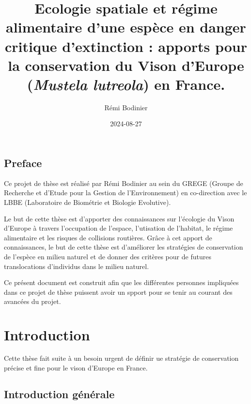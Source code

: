 \documentclass[
  letterpaper,
  DIV=11,
  numbers=noendperiod]{scrreprt}
\title{Ecologie spatiale et régime alimentaire d'une espèce en danger
critique d'extinction : apports pour la conservation du Vison d'Europe
(\emph{Mustela lutreola}) en France.}
\author{Rémi Bodinier}
\date{2024-08-27}
\renewcommand*\contentsname{Table of contents}
\newcommand\contentsname{Table of contents}
\begin{document}
\maketitle

\renewcommand*\contentsname{Table of contents}
{
\hypersetup{linkcolor=}
\setcounter{tocdepth}{2}
\tableofcontents
}

\chapter*{Preface}\label{preface}


Ce projet de thèse est réalisé par Rémi Bodinier au sein du GREGE
(Groupe de Recherche et d'Etude pour la Gestion de l'Environnement) en
co-direction avec le LBBE (Laboratoire de Biométrie et Biologie
Evolutive).

Le but de cette thèse est d'apporter des connaissances sur l'écologie du
Vison d'Europe à travers l'occupation de l'espace, l'utisation de
l'habitat, le régime alimentaire et les risques de collisions routières.
Grâce à cet apport de connaissances, le but de cette thèse est
d'améliorer les stratégies de conservation de l'espèce en milieu naturel
et de donner des critères pour de futures translocations d'individus
dans le milieu naturel.

Ce présent document est construit afin que les différentes personnes
impliquées dans ce projet de thèse puissent avoir un spport pour se
tenir au courant des avancées du projet.

\part{Introduction}

Cette thèse fait suite à un besoin urgent de définir ue stratégie de
conservation précise et fine pour le vison d'Europe en France.

\chapter{Introduction générale}\label{introduction-guxe9nuxe9rale}
\end{document}
